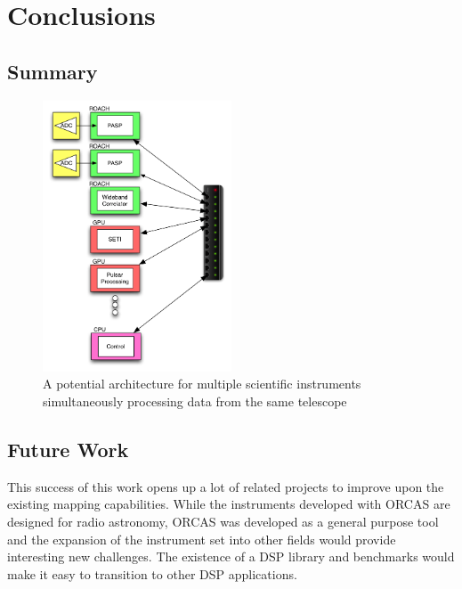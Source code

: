 \chapter{Conclusions}
\label{chap:Conclusions}


\section{Summary}
\begin{figure}[ht!]
  \centering
    \includegraphics[width=0.5\textwidth]{Images/C5/universal_arch.png}
  \caption{A potential architecture for multiple scientific instruments simultaneously processing data from the same telescope}
  \label{fig: C5/universal_arch.png}
\end{figure}

\section{Future Work}
This success of this work opens up a lot of related projects to improve upon the existing mapping capabilities.
While the instruments developed with ORCAS are designed for radio astronomy, ORCAS was developed as a general purpose tool and the expansion of the instrument set into other fields would provide interesting new challenges.
The existence of a DSP library and benchmarks would make it easy to transition to other DSP applications.

